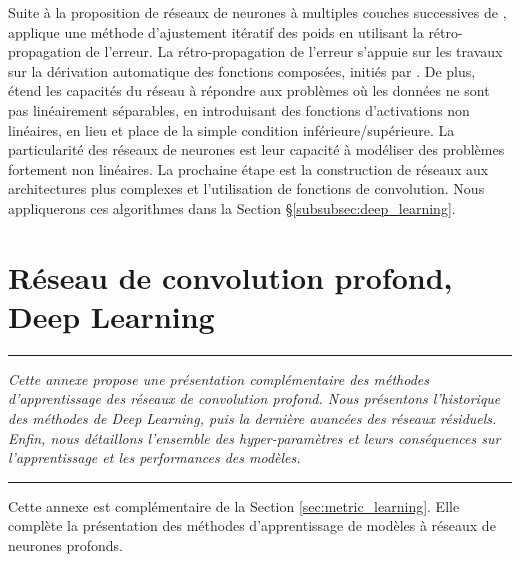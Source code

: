 Suite à la proposition de réseaux de neurones à multiples couches successives de \citeauthor{fukushima_neocognitron_1980} \cite{fukushima_neocognitron_1980}, \citeauthor{rumelhart_learning_1985} \cite{rumelhart_learning_1985} applique une méthode d'ajustement itératif des poids en utilisant la rétro-propagation de l'erreur.
La rétro-propagation de l'erreur s'appuie sur les travaux sur la dérivation automatique des fonctions composées, initiés par \citeauthor{linnainmaa_taylor_1976} \cite{linnainmaa_taylor_1976}.
De plus, \citeauthor{rumelhart_learning_1985} \cite{rumelhart_learning_1985} étend les capacités du réseau à répondre aux problèmes où les données ne sont pas linéairement séparables, en introduisant des fonctions d'activations non linéaires, en lieu et place de la simple condition inférieure/supérieure.
La particularité des réseaux de neurones est leur capacité à modéliser des problèmes fortement non linéaires.
La prochaine étape est la construction de réseaux aux architectures plus complexes et l'utilisation de fonctions de convolution.
Nous appliquerons ces algorithmes dans la Section §\ref{subsubsec:deep_learning}.


\FloatBarrier
\chapter{Réseau de convolution profond, Deep Learning}
\label{Ann:deep_learning}

\begin{center}
	\rule{0.7\linewidth}{.5pt}
	\begin{minipage}{0.7\linewidth}
		\smallskip
		\textit{
			Cette annexe propose une présentation complémentaire des méthodes d'apprentissage des réseaux de convolution profond.
			Nous présentons l'historique des méthodes de Deep Learning, puis la dernière avancées des réseaux résiduels.
			Enfin, nous détaillons l'ensemble des hyper-paramètres et leurs conséquences sur l'apprentissage et les performances des modèles.
		}
	\end{minipage}
	\smallskip
	\rule{0.7\linewidth}{.5pt}
\end{center}

\bigskip

Cette annexe est complémentaire de la Section \ref{sec:metric_learning}.
Elle complète la présentation des méthodes d'apprentissage de modèles à réseaux de neurones profonds.


